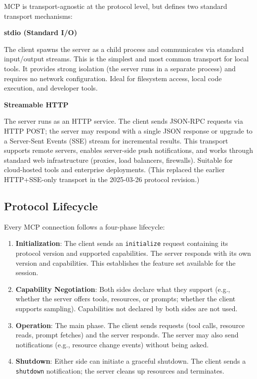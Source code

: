 MCP is transport-agnostic at the protocol level, but defines two standard transport mechanisms:

\textbf{stdio (Standard I/O)}

The client spawns the server as a child process and communicates via standard input/output streams. This is the simplest and most common transport for local tools. It provides strong isolation (the server runs in a separate process) and requires no network configuration. Ideal for filesystem access, local code execution, and developer tools.

\textbf{Streamable HTTP}

The server runs as an HTTP service. The client sends JSON-RPC requests via HTTP POST; the server may respond with a single JSON response or upgrade to a Server-Sent Events (SSE) stream for incremental results. This transport supports remote servers, enables server-side push notifications, and works through standard web infrastructure (proxies, load balancers, firewalls). Suitable for cloud-hosted tools and enterprise deployments. (This replaced the earlier HTTP+SSE-only transport in the 2025-03-26 protocol revision.)

\subsection{Protocol Lifecycle}
\label{protocol-lifecycle}

Every MCP connection follows a four-phase lifecycle:

\begin{enumerate}
  \item \textbf{Initialization}: The client sends an \texttt{initialize} request containing its protocol version and supported capabilities. The server responds with its own version and capabilities. This establishes the feature set available for the session.
  \item \textbf{Capability Negotiation}: Both sides declare what they support (e.g., whether the server offers tools, resources, or prompts; whether the client supports sampling). Capabilities not declared by both sides are not used.
  \item \textbf{Operation}: The main phase. The client sends requests (tool calls, resource reads, prompt fetches) and the server responds. The server may also send notifications (e.g., resource change events) without being asked.
  \item \textbf{Shutdown}: Either side can initiate a graceful shutdown. The client sends a \texttt{shutdown} notification; the server cleans up resources and terminates.
\end{enumerate}

